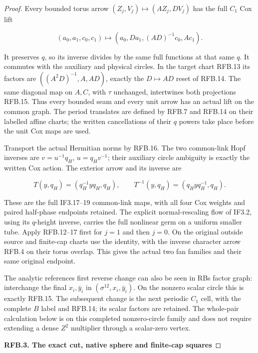 \begin{proof}
Every bounded torus arrow \((Z_j,V_j)\mapsto(AZ_j,DV_j)\)
has the full \(C_1\) Cox lift

\[
 (a_0,a_1,c_0,c_1)\mapsto
 (a_0,Da_1,(AD)^{-1}c_0,Ac_1).
 \tag{RFB.16}
\]

It preserves \(q\), so its inverse divides by the same full
functions at that same \(q\). It commutes with the auxiliary and
physical circles. In the target chart RFB.13 its factors are
\(((A^2D)^{-1},A,AD)\), exactly the \(D\mapsto AD\) reset
of RFB.14. The same diagonal map on \(A,C\), with \(\tau\)
unchanged, intertwines both projections RFB.15. Thus every bounded
seam and every unit arrow has an actual lift on the common graph.
The period translates are defined by RFB.7 and RFB.14 on their
labelled affine charts; the written cancellations of their \(q\)
powers take place before the unit Cox maps are used.

Transport the actual Hermitian norms by RFB.16. The two common-link
Hopf inverses are \(v=u^{-1}q_H\), \(u=q_Hv^{-1}\); their auxiliary
circle ambiguity is exactly the written Cox action. The exterior
arrow and its inverse are

\[
 T(y,q_H)=(q_H^{-1}yq_H,q_H),\qquad
 T^{-1}(y,q_H)=(q_Hyq_H^{-1},q_H).
 \tag{RFB.17}
\]

These are the full IF3.17--19 common-link maps, with all four Cox
weights and paired half-phase endpoints retained. The explicit
normal-rescaling flow of IF3.2, using its \(q\)-height inverse,
carries the full nonlinear germ on a uniform smaller tube. Apply
RFB.12--17 first for \(j=1\) and then \(j=0\). On the original
outside source and finite-cap charts use the identity, with the
inverse character arrow RFB.4 on their torus overlap. This gives
the actual two fan families and their same original endpoint.

The analytic reference\textquotesingle s first reverse change can also be seen in
RB\textquotesingle s factor graph: interchange the final \(x_i,\bar y_i\) in
\((\sigma^{12},x_i,\bar y_i)\). On the nonzero scalar circle this
is exactly RFB.15. The subsequent change is the next periodic
\(C_1\) cell, with the complete \(B\) label and RFB.14; its scalar
factors are retained. The whole-pair calculation below is on this
completed nonzero-circle family and does not require extending a
dense \(Z^2\) multiplier through a scalar-zero vertex.

\par

\medskip\noindent\textbf{RFB.3. The exact cut, native sphere and finite-cap squares}


\end{proof}

